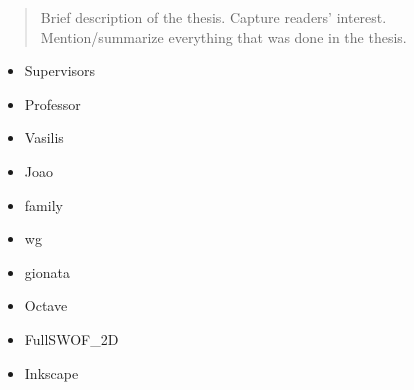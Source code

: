 \documentclass[
11pt, %
english, %
singlespacing, %
headsepline, %
]{MastersDoctoralThesis} %
\begin{document}




\begin{abstract}
\addchaptertocentry{\abstractname} %
Brief description of the thesis. Capture readers' interest. Mention/summarize everything that was done in the thesis.
\end{abstract}


\begin{acknowledgements}
\addchaptertocentry{\acknowledgementname} %
\begin{itemize}
\itemsep0em
  \item Supervisors
  \item Professor
  \item Vasilis
  \item Joao
  \item family
  \item wg
  \item gionata
  \item Octave
  \item FullSWOF\_2D
  \item Inkscape
\end{itemize}
\end{acknowledgements}


\end{document}
